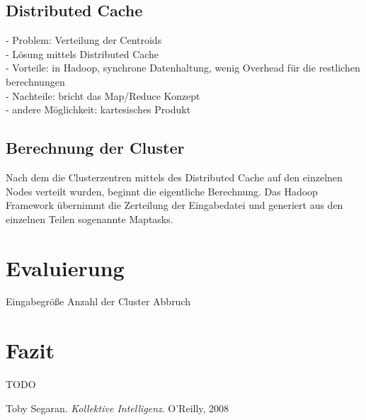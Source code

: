 \documentclass[a4paper]{llncs}
\begin{document}
\subsection{Distributed Cache}
- Problem: Verteilung der Centroids\\
- Lösung mittels Distributed Cache\\
- Vorteile: in Hadoop, synchrone Datenhaltung, wenig Overhead für die restlichen berechnungen\\
- Nachteile: bricht das Map/Reduce Konzept\\
- andere Möglichkeit: kartesisches Produkt

\subsection{Berechnung der Cluster}
Nach dem die Clusterzentren mittels des Distributed Cache auf den einzelnen Nodes verteilt wurden, beginnt die eigentliche Berechnung. Das Hadoop Framework übernimmt die Zerteilung der Eingabedatei und generiert aus den einzelnen Teilen sogenannte Maptasks. 

\section{Evaluierung}
Eingabegröße
Anzahl der Cluster
Abbruch

\section{Fazit}
TODO

\begin{thebibliography}{--------}

  Toby Segaran.
  {\em Kollektive Intelligenz}.
  O'Reilly, 2008
   
\end{thebibliography}
\end{document}
